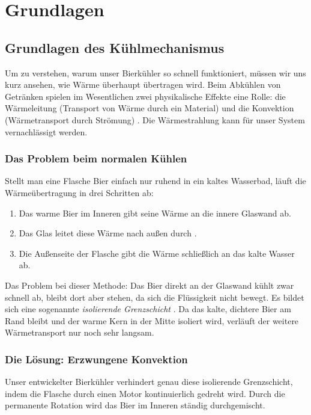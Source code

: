 \chapter{Grundlagen}
\label{cha:Grundlagen des Kühlmechanismus}

\section{Grundlagen des Kühlmechanismus}
Um zu verstehen, warum unser Bierkühler so schnell funktioniert, müssen wir uns kurz ansehen, wie Wärme überhaupt übertragen wird. Beim Abkühlen von Getränken spielen im Wesentlichen zwei physikalische Effekte eine Rolle: die Wärmeleitung (Transport von Wärme durch ein Material) und die Konvektion (Wärmetransport durch Strömung) \cite[vgl. S. 117]{Böckh}. Die Wärmestrahlung kann für unser System vernachlässigt werden.

\subsection{Das Problem beim normalen Kühlen}
Stellt man eine Flasche Bier einfach nur ruhend in ein kaltes Wasserbad, läuft die Wärmeübertragung in drei Schritten ab:
\begin{enumerate}
	\item Das warme Bier im Inneren gibt seine Wärme an die innere Glaswand ab.
	\item Das Glas leitet diese Wärme nach außen durch \cite[vgl. S. 110ff]{Böckh}.
	\item Die Außenseite der Flasche gibt die Wärme schließlich an das kalte Wasser ab.
\end{enumerate}

Das Problem bei dieser Methode: Das Bier direkt an der Glaswand kühlt zwar schnell ab, bleibt dort aber stehen, da sich die Flüssigkeit nicht bewegt. Es bildet sich eine sogenannte \textit{isolierende Grenzschicht} \cite{wiki_grenzschicht}. Da das kalte, dichtere Bier am Rand bleibt und der warme Kern in der Mitte isoliert wird, verläuft der weitere Wärmetransport nur noch sehr langsam.

\subsection{Die Lösung: Erzwungene Konvektion}
Unser entwickelter Bierkühler verhindert genau diese isolierende Grenzschicht, indem die Flasche durch einen Motor kontinuierlich gedreht wird. Durch die permanente Rotation wird das Bier im Inneren ständig durchgemischt. 

